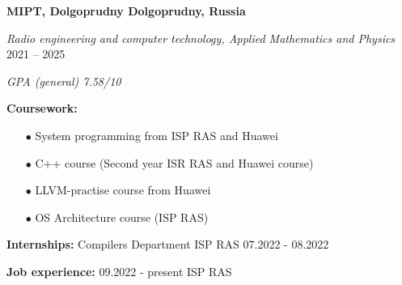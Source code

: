 \textbf{MIPT, Dolgoprudny \hfill Dolgoprudny, Russia} \par
\textit{Radio engineering and computer technology, Applied Mathematics and Physics} \hfill 2021 -- 2025\par
\textit{GPA (general) 7.58/10} \par
\textbf{Coursework:}
\begin{enumerate}
    \item[$\bullet$] System programming from ISP RAS and Huawei
    \item[$\bullet$] C++ course (Second year ISR RAS and Huawei course)
    \item[$\bullet$] LLVM-practise course from Huawei
    \item[$\bullet$] OS Architecture course (ISP RAS) 
\end{enumerate}
\textbf{Internships:} Compilers Department ISP RAS 07.2022 - 08.2022 \par
\textbf{Job experience:} 09.2022 - present ISP RAS